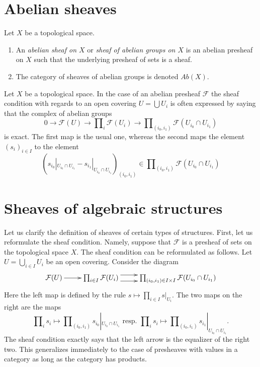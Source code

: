 \section{Abelian sheaves}
\label{section-abelian-sheaves}

\begin{definition}
\label{definition-abelian-sheaf}
Let $X$ be a topological space.
\begin{enumerate}
\item An {\it abelian sheaf on $X$} or
{\it sheaf of abelian groups on $X$}
is an abelian presheaf on $X$ such that the underlying presheaf of
sets is a sheaf.
\item The category of sheaves of abelian groups
is denoted $\textit{Ab}(X)$.
\end{enumerate}
\end{definition}

\noindent
Let $X$ be a topological space.
In the case of an abelian presheaf $\mathcal{F}$ the sheaf
condition with regards to an open covering $U = \bigcup U_i$
is often expressed by saying that the complex of abelian groups
$$
0 \to \mathcal{F}(U)
\to \prod\nolimits_i \mathcal{F}(U_i)
\to \prod\nolimits_{(i_0, i_1)} \mathcal{F}(U_{i_0} \cap U_{i_1})
$$
is exact. The first map is the usual one, whereas the second
maps the element $(s_i)_{i \in I}$ to the element
$$
(
s_{i_0}|_{U_{i_0} \cap U_{i_1}} -
s_{i_1}|_{U_{i_0} \cap U_{i_1}}
)_{(i_0, i_1)}
\in \prod\nolimits_{(i_0, i_1)} \mathcal{F}(U_{i_0} \cap U_{i_1})
$$

\section{Sheaves of algebraic structures}
\label{section-sheaves-structures}

\noindent
Let us clarify the definition of sheaves of certain types of structures.
First, let us reformulate the sheaf condition. Namely, suppose that
$\mathcal{F}$ is a presheaf of sets on the topological space $X$.
The sheaf condition can be reformulated as follows. Let
$U = \bigcup_{i\in I} U_i$ be an open covering. Consider the
diagram
$$
\xymatrix{
\mathcal{F}(U) \ar[r]
&
\prod\nolimits_{i\in I}
\mathcal{F}(U_i)
\ar@<1ex>[r] \ar@<-1ex>[r]
&
\prod\nolimits_{(i_0, i_1) \in I\times I}
\mathcal{F}(U_{i_0} \cap U_{i_1})
}
$$
Here the left map is defined by the rule
$s \mapsto \prod_{i \in I} s|_{U_i}$. The two maps
on the right are the maps
$$
\prod\nolimits_i s_i
\mapsto
\prod\nolimits_{(i_0, i_1)} s_{i_0}|_{U_{i_0} \cap U_{i_1}}
\text{ resp. }
\prod\nolimits_i s_i
\mapsto
\prod\nolimits_{(i_0, i_1)} s_{i_1}|_{U_{i_0} \cap U_{i_1}}.
$$
The sheaf condition exactly says that the left arrow
is the equalizer of the right two. This generalizes
immediately to the case of presheaves with values in a
category as long as the category has products.

